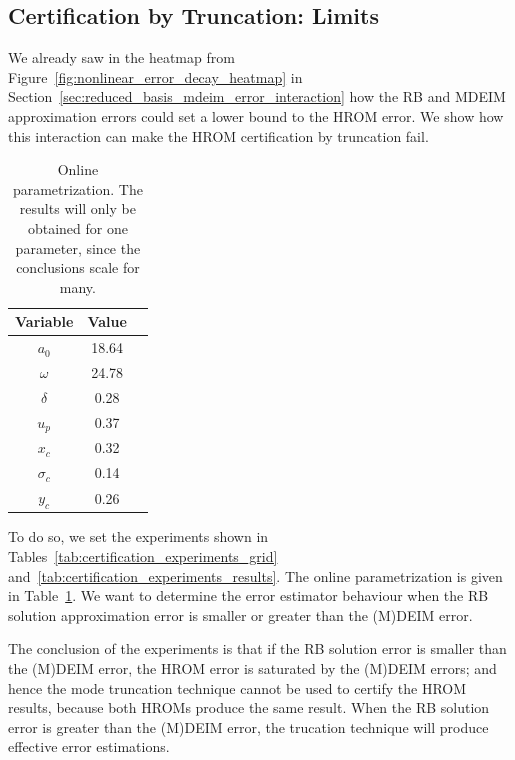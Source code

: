 \documentclass[../../thesis.tex]{subfiles}
\begin{document}
\subsection{Certification by Truncation: Limits}
\label{sec:certification_limits}
We already saw in the heatmap from Figure~\ref{fig:nonlinear_error_decay_heatmap}
in Section~\ref{sec:reduced_basis_mdeim_error_interaction}
how the RB and MDEIM approximation errors could 
set a lower bound to the HROM error.
We show how this interaction can make 
the HROM certification by truncation fail.
\begin{table}[h]
    \centering
    \caption{Online parametrization.
    The results will only be obtained for one parameter,
    since the conclusions scale for many.}
    \begin{tabular}{ccc}
    \toprule
        Variable   & Value  \\ 
        \midrule
        $a_0$      & 18.64   \\
        $\omega$   & 24.78   \\
        $\delta$   & 0.28    \\
        $u_p$      & 0.37    \\
        \midrule
        $x_c$      & 0.32    \\
        $\sigma_c$ & 0.14    \\
        $y_c$      & 0.26    \\ 
        \bottomrule
    \end{tabular}
    \label{tab:parameters_online_arbitrary}
\end{table}
To do so, we set the experiments shown in 
Tables~\ref{tab:certification_experiments_grid} 
and~\ref{tab:certification_experiments_results}.
The online parametrization is given in Table~\ref{tab:parameters_online_arbitrary}.
We want to determine the error estimator behaviour when 
the RB solution approximation error is smaller or greater than the (M)DEIM error.

The conclusion of the experiments is that if the RB solution error 
is smaller than the (M)DEIM error,
the HROM error is saturated by the (M)DEIM errors;
and hence the mode truncation technique cannot be used to certify the HROM results,
because both HROMs produce the same result.
When the RB solution error is greater than the (M)DEIM error, 
the trucation technique will produce effective error estimations.
\end{document}
